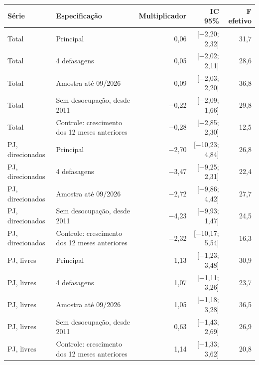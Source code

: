 \begin{tabular}{llrrr}
\toprule
Série & Especificação & Multiplicador & IC 95\% & F efetivo \\
\midrule
Total & Principal & 0{,}06 & [\ensuremath{-}2{,}20; 2{,}32] & 31{,}7 \\
Total & 4 defasagens & 0{,}05 & [\ensuremath{-}2{,}02; 2{,}11] & 28{,}6 \\
Total & Amostra até 09/2026 & 0{,}09 & [\ensuremath{-}2{,}03; 2{,}20] & 36{,}8 \\
Total & Sem desocupação, desde 2011 & \ensuremath{-}0{,}22 & [\ensuremath{-}2{,}09; 1{,}66] & 29{,}8 \\
Total & Controle: crescimento dos 12 meses anteriores & \ensuremath{-}0{,}28 & [\ensuremath{-}2{,}85; 2{,}30] & 12{,}5 \\
PJ, direcionados & Principal & \ensuremath{-}2{,}70 & [\ensuremath{-}10{,}23; 4{,}84] & 26{,}8 \\
PJ, direcionados & 4 defasagens & \ensuremath{-}3{,}47 & [\ensuremath{-}9{,}25; 2{,}31] & 22{,}4 \\
PJ, direcionados & Amostra até 09/2026 & \ensuremath{-}2{,}72 & [\ensuremath{-}9{,}86; 4{,}42] & 27{,}7 \\
PJ, direcionados & Sem desocupação, desde 2011 & \ensuremath{-}4{,}23 & [\ensuremath{-}9{,}93; 1{,}47] & 24{,}5 \\
PJ, direcionados & Controle: crescimento dos 12 meses anteriores & \ensuremath{-}2{,}32 & [\ensuremath{-}10{,}17; 5{,}54] & 16{,}3 \\
PJ, livres & Principal & 1{,}13 & [\ensuremath{-}1{,}23; 3{,}48] & 30{,}9 \\
PJ, livres & 4 defasagens & 1{,}07 & [\ensuremath{-}1{,}11; 3{,}26] & 23{,}7 \\
PJ, livres & Amostra até 09/2026 & 1{,}05 & [\ensuremath{-}1{,}18; 3{,}28] & 36{,}5 \\
PJ, livres & Sem desocupação, desde 2011 & 0{,}63 & [\ensuremath{-}1{,}43; 2{,}69] & 26{,}9 \\
PJ, livres & Controle: crescimento dos 12 meses anteriores & 1{,}14 & [\ensuremath{-}1{,}33; 3{,}62] & 20{,}8 \\
\bottomrule
\end{tabular}
